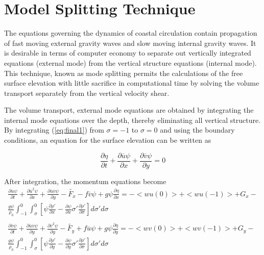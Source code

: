 \documentclass[oribibl]{llncs}
\begin{document}
\section{Model Splitting Technique}
 
The equations governing the dynamics of coastal circulation contain propagation of fast moving external gravity waves and slow moving internal gravity waves. It is desirable in terms of computer economy to separate out vertically integrated equations (external mode) from the vertical structure equations (internal mode). This technique, known as mode splitting permits the calculations of the free surface elevation with little sacrifice in computational time by solving the volume transport separately from the vertical velocity shear.

The volume transport, external mode equations are obtained by integrating the internal mode equations over the depth, thereby eliminating all vertical structure. By integrating (\ref{eq:final1}) from $\sigma=-1$ to $\sigma=0$ and using the boundary conditions, an equation for the surface elevation can be written as

\begin{equation}
\frac{\partial \eta}{\partial t} + \frac{\partial \overline{u}\psi}{\partial x} + \frac{\partial \overline{v}\psi}{\partial y} =0
\end{equation}

After integration, the momentum equations become
\begin{eqnarray}
\frac{\partial \overline{u} \psi}{\partial t} + \frac{\partial \overline{u}^2 \psi}{\partial x} +\frac{\partial \overline{u}\overline{v} \psi}{\partial y} - \tilde{F_x}-f \overline{v} \psi + g\psi \frac{\partial \eta}{\partial x} = -<wu(0)> +<wu(-1)> + G_x- \nonumber \\
 \frac{g\psi}{\rho_0} \int_{-1}^0 \int_{\sigma}^0 \left[ \psi \frac{\partial \rho'}{\partial x}  - \frac{\partial \psi}{\partial x} \sigma '  \frac{\partial \rho'}{\partial \sigma} \right] d \sigma ' d \sigma \label{eq:intm1} \\
\nonumber\\
 \frac{\partial \overline{v} \psi}{\partial t} + \frac{\partial \overline{u}\overline{v} \psi}{\partial y} +\frac{\partial \overline{v}^2 \psi}{\partial y} - \tilde{F_y} + f \overline{u} \psi + g\psi \frac{\partial \eta}{\partial y} = -<wv(0)> +<wv(-1)> + G_y- \nonumber \\
 \frac{g\psi}{\rho_0} \int_{-1}^0 \int_{\sigma}^0 \left[ \psi \frac{\partial \rho'}{\partial y}  - \frac{\partial \psi}{\partial y} \sigma '  \frac{\partial \rho'}{\partial \sigma} \right] d \sigma ' d \sigma  \label{eq:intm2} 
\end{eqnarray}
\end{document}
